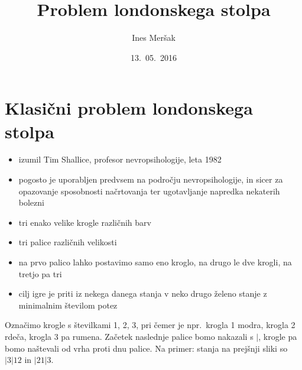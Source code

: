 \documentclass[11pt,a4paper]{article}
\title{Problem londonskega stolpa}
\author{Ines Meršak}
\date{13.~05.~2016}
\theoremstyle{definition} %
\theoremstyle{plain} %
\begin{document}
\maketitle

 
\section{Klasični problem londonskega stolpa}

\begin{itemize}
    \item izumil Tim Shallice, profesor nevropsihologije, leta 1982
    \item pogosto je uporabljen predvsem na področju nevropsihologije, in sicer za opazovanje sposobnosti načrtovanja ter ugotavljanje napredka nekaterih bolezni
    \item tri enako velike krogle različnih barv
    \item tri palice različnih velikosti
    \item na prvo palico lahko postavimo samo eno kroglo, na drugo le dve krogli, na tretjo pa tri
    \item cilj igre je priti iz nekega danega stanja v neko drugo želeno stanje z minimalnim številom potez
\end{itemize}

Označimo krogle s številkami 1, 2, 3, pri čemer je npr.\ krogla 1 modra, krogla 2 rdeča, krogla 3 pa rumena. Začetek naslednje palice bomo nakazali s $|$, krogle pa bomo naštevali od vrha proti dnu palice.
Na primer: stanja na prejšnji sliki so $|3|12$ in $|21|3$.

%
\end{document}
